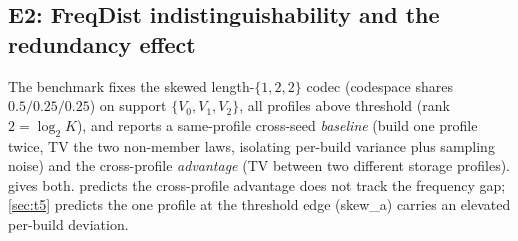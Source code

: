 \documentclass[sigconf,nonacm,anonymous,balance=false]{acmart}
\begin{document}
\subsection{E2: FreqDist indistinguishability and the redundancy effect}

The benchmark fixes the skewed length-$\{1,2,2\}$ codec (codespace shares
$0.5/0.25/0.25$) on support $\{V_0, V_1, V_2\}$, all profiles above threshold (rank
$2 = \log_2 K$), and reports a same-profile cross-seed \emph{baseline} (build one profile
twice, TV the two non-member laws, isolating per-build variance plus sampling noise) and
the cross-profile \emph{advantage} (TV between two different storage profiles).
 gives both.  predicts the cross-profile advantage does
not track the frequency gap; \cref{sec:t5} predicts the one profile at the threshold edge
(skew\_a) carries an elevated per-build deviation.

\begin{table}[t]
  \centering
  \caption{E2: same-profile baseline and cross-profile advantage. The advantage tracks the
  noisier (thinner) profile, not the frequency gap: every pair including the thin skew\_a
  lands at $\sim 0.014$ regardless of the gap, while a real $33$-vs-$90$ gap between two
  rich profiles sits at the $\sim 0.0036$ floor.}
  \label{tab:e2}
\end{table}
\end{document}

